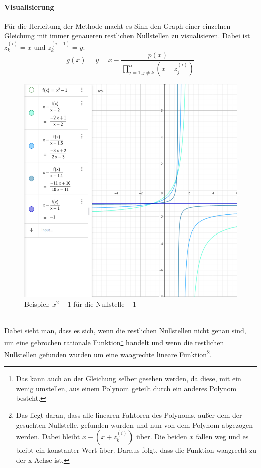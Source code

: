 \documentclass[12pt]{article}
\begin{document}
\paragraph{Visualisierung}
Für die Herleitung der Methode macht es Sinn den Graph einer einzelnen Gleichung mit immer genaueren restlichen Nullstellen zu visualisieren. Dabei ist $z_k^{(i)} = x$ und $z_k^{(i+1)} = y$:
\begin{equation}
    g(x) = y = x - \frac{p(x)}{\prod_{j=1;j\neq k}^{n} (x-z_j^{(i)})}
\end{equation}
\begin{figure}[h]
    \centering
    \includegraphics[scale=.6]{BeispielHerleitung.png}
    \caption{Beispiel: $x^2-1$ für die Nullstelle $-1$}
\end{figure}\\
Dabei sieht man, dass es sich, wenn die restlichen Nullstellen nicht genau sind, um eine gebrochen rationale Funktion\footnote{Das kann auch an der Gleichung selber gesehen werden, da diese, mit ein wenig umstellen, aus einem Polynom geteilt durch ein anderes Polynom besteht.} handelt und wenn die restlichen Nullstellen gefunden wurden um eine waagrechte lineare Funktion\footnote{Das liegt daran, dass alle linearen Faktoren des Polynoms, außer dem der gesuchten Nullstelle, gefunden wurden und nun von dem Polynom abgezogen werden. Dabei bleibt $x-(x+z_k^{(i)})$ über. Die beiden $x$ fallen weg und es bleibt ein konstanter Wert über. Daraus folgt, dass die Funktion waagrecht zu der x-Achse ist.}. 
\end{document}

